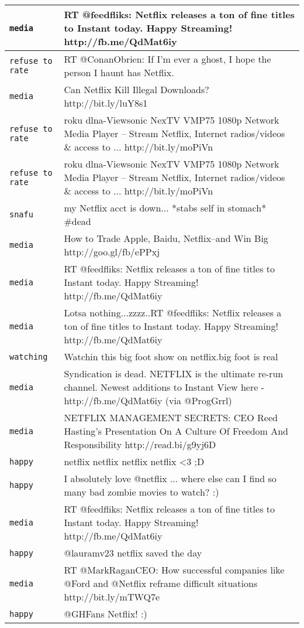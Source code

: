 {\begin{longtable}{|l|p{160mm}|}
      \tabularnewline\hline
         \texttt{media} & RT @feedfliks: Netflix releases a ton of fine titles to Instant today. Happy Streaming! http://fb.me/QdMat6iy
      \tabularnewline\hline
         \texttt{refuse to rate} & RT @ConanObrien: If I'm ever a ghost, I hope the person I haunt has Netflix.
      \tabularnewline\hline
         \texttt{media} & Can Netflix Kill Illegal Downloads? http://bit.ly/luY8s1
      \tabularnewline\hline
         \texttt{refuse to rate} & roku dlna-Viewsonic NexTV VMP75 1080p Network Media Player -- Stream Netflix, Internet radios/videos \& access to ... http://bit.ly/moPiVn
      \tabularnewline\hline
         \texttt{refuse to rate} & roku dlna-Viewsonic NexTV VMP75 1080p Network Media Player -- Stream Netflix, Internet radios/videos \& access to ... http://bit.ly/moPiVn
      \tabularnewline\hline
         \texttt{snafu} & my Netflix acct is down... *stabs self in stomach* \#dead
      \tabularnewline\hline
         \texttt{media} & How to Trade Apple, Baidu, Netflix--and Win Big http://goo.gl/fb/ePPxj
      \tabularnewline\hline
         \texttt{media} & RT @feedfliks: Netflix releases a ton of fine titles to Instant today. Happy Streaming! http://fb.me/QdMat6iy
      \tabularnewline\hline
         \texttt{media} & Lotsa nothing...zzzz..RT @feedfliks: Netflix releases a ton of fine titles to Instant today. Happy Streaming! http://fb.me/QdMat6iy
      \tabularnewline\hline
         \texttt{watching} & Watchin this big foot show on netflix.big foot is real
      \tabularnewline\hline
         \texttt{media} & Syndication is dead. NETFLIX is the ultimate re-run channel. Newest additions to Instant View here - http://fb.me/QdMat6iy (via @ProgGrrl)
      \tabularnewline\hline
         \texttt{media} & NETFLIX MANAGEMENT SECRETS: CEO Reed Hasting's Presentation On A Culture Of Freedom And Responsibility http://read.bi/g9yj6D
      \tabularnewline\hline
         \texttt{happy} & netflix netflix netflix netflix <3 ;D
      \tabularnewline\hline
         \texttt{happy} & I absolutely love @netflix ... where else can I find so many bad zombie movies to watch? :)
      \tabularnewline\hline
         \texttt{media} & RT @feedfliks: Netflix releases a ton of fine titles to Instant today. Happy Streaming! http://fb.me/QdMat6iy
      \tabularnewline\hline
         \texttt{happy} & @lauramv23 netflix saved the day
      \tabularnewline\hline
         \texttt{media} & RT @MarkRaganCEO: How successful companies like @Ford and @Netflix reframe difficult situations http://bit.ly/mTWQ7e
      \tabularnewline\hline
         \texttt{happy} & @GHFans Netflix! :)

\end{longtable}}
